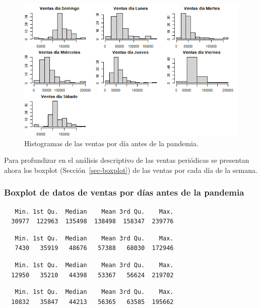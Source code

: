 \documentclass[
  us-letterpaper,
]{scrreprt}
\theoremstyle{plain}
\theoremstyle{plain}
\theoremstyle{definition}
\theoremstyle{remark}
\begin{document}
\begin{figure}[H]

{\centering \includegraphics[width=0.8\linewidth,height=\textheight,keepaspectratio]{his_1.png}

}

\caption{Histogramas de las ventas por día antes de la pandemia.}

\end{figure}%

Para profundizar en el análisis descriptivo de las ventas periódicas se
presentan ahora los boxplot (Sección~\ref{sec-boxplot}) de las ventas
por cada día de la semana.

\subsubsection{Boxplot de datos de ventas por días antes de la
pandemia}\label{boxplot-de-datos-de-ventas-por-duxedas-antes-de-la-pandemia}

\begin{verbatim}
   Min. 1st Qu.  Median    Mean 3rd Qu.    Max. 
  30977  122963  135498  138498  158347  239776 
\end{verbatim}

\begin{verbatim}
   Min. 1st Qu.  Median    Mean 3rd Qu.    Max. 
   7430   35919   48676   57388   68030  172946 
\end{verbatim}

\begin{verbatim}
   Min. 1st Qu.  Median    Mean 3rd Qu.    Max. 
  12950   35210   44398   53367   56624  219702 
\end{verbatim}

\begin{verbatim}
   Min. 1st Qu.  Median    Mean 3rd Qu.    Max. 
  10832   35847   44213   56365   63585  195662 
\end{verbatim}
\end{document}
